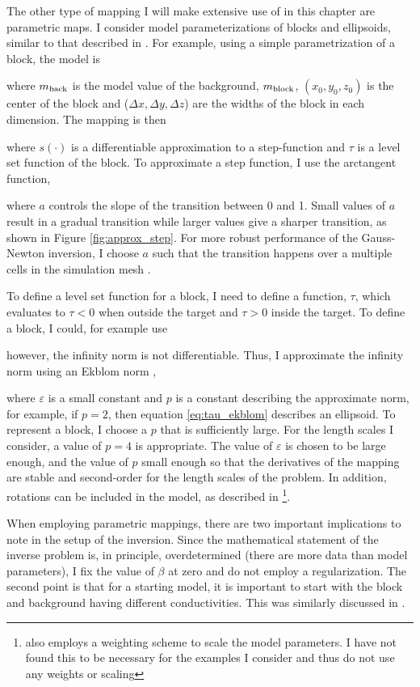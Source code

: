 The other type of mapping I will make extensive use of in this chapter are parametric maps. I consider model parameterizations of blocks and ellipsoids, similar to that described in \cite{McMillan2015a, Mcmillan2017}. For example, using a simple parametrization of a block, the model is

where $m_{\rm back}$ is the model value of the background, $m_{\rm block}$, $(x_0, y_0, z_0)$ is the center of the block and ($\Delta x, \Delta y, \Delta z$) are the widths of the block in each dimension. The mapping is then

where $s(\cdot)$ is a differentiable approximation to a step-function and $\tau$ is a level set function of the block. To approximate a step function, I use the arctangent function,

where $a$ controls the slope of the transition between 0 and 1. Small values of $a$ result in a gradual transition while larger values give a sharper transition, as shown in Figure \ref{fig:approx_step}. For more robust performance of the Gauss-Newton inversion, I choose $a$ such that the transition happens over a multiple cells in the simulation mesh \citep{Mcmillan2017}.




To define a level set function for a block, I need to define a function, $\tau$, which evaluates to $\tau < 0$ when outside the target and $\tau > 0$ inside the target. To define a block, I could, for example use

however, the infinity norm is not differentiable. Thus, I approximate the infinity norm using an Ekblom norm \citep{Ekblom1973},

where $\varepsilon$ is a small constant and $p$ is a constant describing the approximate norm, for example, if $p=2$, then equation \ref{eq:tau_ekblom} describes an ellipsoid. To represent a block, I choose a $p$ that is sufficiently large. For the length scales I consider, a value of $p=4$ is appropriate. The value of $\varepsilon$ is chosen to be large enough, and the value of $p$ small enough so that the derivatives of the mapping are stable and second-order for the length scales of the problem. In addition, rotations can be included in the model, as described in \cite{Mcmillan2017} \footnote{\cite{Mcmillan2017} also employs a weighting scheme to scale the model parameters. I have not found this to be necessary for the examples I consider and thus do not use any weights or scaling}.

When employing parametric mappings, there are two important implications to note in the setup of the inversion. Since the mathematical statement of the inverse problem is, in principle, overdetermined (there are more data than model parameters), I fix the value of $\beta$ at zero and do not employ a regularization. The second point is that for a starting model, it is important to start with the block and background having different conductivities. This was similarly discussed in \cite{Mcmillan2017}.

